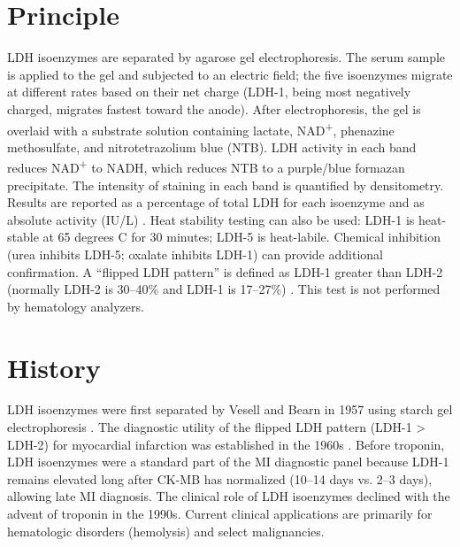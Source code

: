 \section*{Principle}
LDH isoenzymes are separated by agarose gel electrophoresis. The serum sample is applied to the gel and subjected to an electric field; the five isoenzymes migrate at different rates based on their net charge (LDH-1, being most negatively charged, migrates fastest toward the anode). After electrophoresis, the gel is overlaid with a substrate solution containing lactate, NAD\textsuperscript{+}, phenazine methosulfate, and nitrotetrazolium blue (NTB). LDH activity in each band reduces NAD\textsuperscript{+} to NADH, which reduces NTB to a purple/blue formazan precipitate. The intensity of staining in each band is quantified by densitometry. Results are reported as a percentage of total LDH for each isoenzyme and as absolute activity (IU/L) \cite{panteghini2023serum}. Heat stability testing can also be used: LDH-1 is heat-stable at 65 degrees C for 30 minutes; LDH-5 is heat-labile. Chemical inhibition (urea inhibits LDH-5; oxalate inhibits LDH-1) can provide additional confirmation. A ``flipped LDH pattern'' is defined as LDH-1 greater than LDH-2 (normally LDH-2 is 30--40\% and LDH-1 is 17--27\%) \cite{bais1994approved}. This test is not performed by hematology analyzers.

\section*{History}
LDH isoenzymes were first separated by Vesell and Bearn in 1957 using starch gel electrophoresis \cite{vesell1957localization}. The diagnostic utility of the flipped LDH pattern (LDH-1 > LDH-2) for myocardial infarction was established in the 1960s \cite{lott1980serum}. Before troponin, LDH isoenzymes were a standard part of the MI diagnostic panel because LDH-1 remains elevated long after CK-MB has normalized (10--14 days vs. 2--3 days), allowing late MI diagnosis. The clinical role of LDH isoenzymes declined with the advent of troponin in the 1990s. Current clinical applications are primarily for hematologic disorders (hemolysis) and select malignancies.

